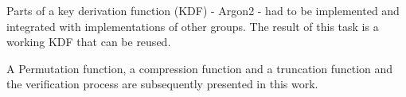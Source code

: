 Parts of a key derivation function (KDF) - Argon2 - had to be implemented and integrated
with implementations of other groups. The result of this task is a working KDF that can be
reused.

A Permutation function, a compression function and a truncation function and the
verification process are subsequently presented in this work.
